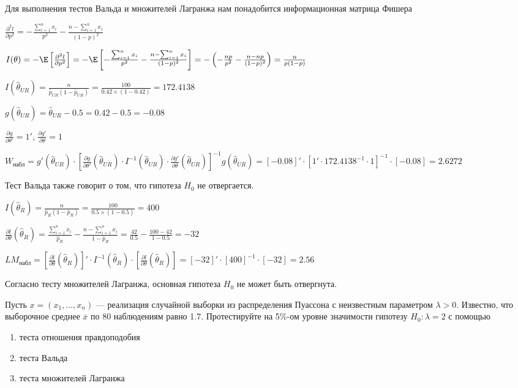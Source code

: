 \documentclass[pdftex,11pt,openany]{book}\usepackage[]{graphicx}\usepackage[]{color}
\begin{document}
\begin{solution}
Для выполнения тестов Вальда и множителей Лагранжа нам понадобится информационная матрица Фишера

$\frac{\partial^2 l}{\partial p^2} = - \frac{\sum_{i=1}^n x_i}{p^2} - \frac{n - \sum_{i=1}^n x_i}{(1 - p)^2}$

$I(\theta) = -\E\left[ \frac{\partial^2 l}{\partial p^2} \right] = -\E \left[ - \frac{\sum_{i=1}^n x_i}{p^2} - \frac{n - \sum_{i=1}^n x_i}{(1 - p)^2} \right] = -\left(-\frac{np}{p^2} - \frac{n - np}{(1-p)^2}\right) = \frac{n}{p(1-p)}$

$I(\hat{\theta}_{UR}) = \frac{n}{\hat{p}_{UR}(1-\hat{p}_{UR})} = \frac{100}{0.42 \times (1 - 0.42)} = 172.4138$

$g(\hat{\theta}_{UR}) = \hat{\theta}_{UR} - 0.5 = 0.42 - 0.5 = -0.08$

$\frac{\partial g}{\partial \theta'} = 1'$, $\frac{\partial g'}{\partial \theta} = 1$

$W_{\text{набл}} = g'(\hat{\theta}_{UR}) \cdot \left[ \frac{\partial g}{\partial \theta'}(\hat{\theta}_{UR}) \cdot I^{-1}(\hat{\theta}_{UR}) \cdot \frac{\partial g'}{\partial \theta}(\hat{\theta}_{UR}) \right]^{-1} g(\hat{\theta}_{UR}) = [-0.08]' \cdot [1' \cdot 172.4138^{-1} \cdot 1]^{-1} \cdot [-0.08] = 2.6272$

Тест Вальда также говорит о том, что гипотеза $H_0$ не отвергается.

$I(\hat{\theta}_{R}) = \frac{n}{\hat{p}_{R}(1-\hat{p}_{R})} = \frac{100}{0.5 \times (1 - 0.5)} = 400$

$\frac{\partial l}{\partial \theta}(\hat{\theta}_R) = \frac{\sum_{i=1}^n x_i}{\hat{p}_R} - \frac{n - \sum_{i=1}^n x_i}{1 - \hat{p}_R} = \frac{42}{0.5} - \frac{100 - 42}{1 - 0.5} = -32$

$LM_{\text{набл}} = \left[ \frac{\partial l}{\partial \theta}(\hat{\theta}_{R}) \right]' \cdot I^{-1}(\hat{\theta}_{R}) \cdot \left[ \frac{\partial l}{\partial \theta}(\hat{\theta}_{R}) \right] = [-32]' \cdot [400]^{-1} \cdot [-32] = 2.56$

Согласно тесту множителей Лагранжа, основная гипотеза $H_0$ не может быть отвергнута.
\end{solution}


\begin{problem}
Пусть $x = (x_1, \ldots, x_n)$ --- реализация случайной выборки из распределения Пуассона с неизвестным параметром $\lambda > 0$. Известно, что выборочное среднее $\overline{x}$ по 80 наблюдениям равно 1.7. Протестируйте на 5\%-ом уровне значимости гипотезу $H_0: \lambda = 2$ с помощью
\begin{enumerate}
\item теста отношения правдоподобия
\item теста Вальда
\item теста множителей Лагранжа
\end{enumerate}
\end{problem}
\end{document}
